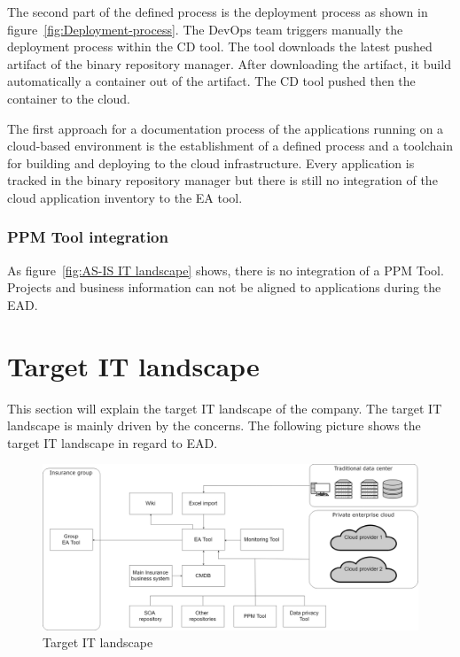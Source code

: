 The second part of the defined process is the deployment process as shown in figure~\ref{fig:Deployment-process}. The DevOps team triggers manually the deployment process within the CD tool. The tool downloads the latest pushed artifact of the binary repository manager. After downloading the artifact, it build automatically a container out of the artifact. The CD tool pushed then the container to the cloud.

The first approach for a documentation process of the applications running on a cloud-based environment is the establishment of a defined process and a toolchain for building and deploying to the cloud infrastructure. Every application is tracked in the binary repository manager but there is still no integration of the cloud application inventory to the EA tool.

\subsubsection{PPM Tool integration}

As figure~\ref{fig:AS-IS IT landscape} shows, there is no integration of a PPM Tool. Projects and business information can not be aligned to applications during the EAD.

\section{Target IT landscape}\label{section:targetitlandscape}

This section will explain the target IT landscape of the company. The target IT landscape is mainly driven by the concerns. The following picture shows the target IT landscape in regard to EAD.

\begin{figure}[htpb]
  \centering
  \includegraphics[width=1.0\textwidth]{figures/target-it-landscape.png}
  \caption{ Target IT landscape}
  \label{fig:Target IT landscape}
\end{figure}

